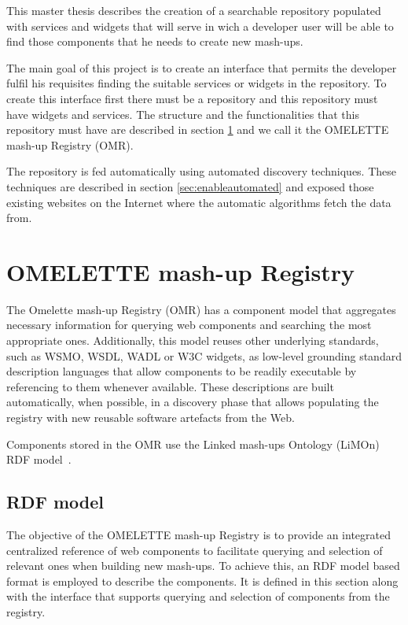 This master thesis describes the creation of a searchable repository populated with services and widgets that will serve in wich a developer user will be able to find those components that he needs to create new mash-ups.

The main goal of this project is to create an interface that permits the developer fulfil his requisites finding the suitable services or widgets in the repository. To create this interface first there must be a repository and this repository must have widgets and services. The structure and the functionalities that this repository must have are described in section \ref{sec:enableomr} and we call it the OMELETTE mash-up Registry (OMR).

The repository is fed automatically using automated discovery techniques. These techniques are described in section \ref{sec:enableautomated} and exposed those existing websites on the Internet where the automatic algorithms fetch the data from.

\section{OMELETTE mash-up Registry}
\label{sec:enableomr}

The Omelette mash-up Registry (OMR) has a component model that aggregates necessary information for querying web components and searching the most appropriate ones. Additionally, this model reuses other underlying standards, such as WSMO, WSDL, WADL or W3C widgets, as low-level grounding standard description languages that allow components to be readily executable by referencing to them whenever available. These descriptions are built automatically, when possible, in a discovery phase that allows populating the registry with new reusable software artefacts from the Web.

Components stored in the OMR use the Linked mash-ups Ontology (LiMOn) RDF model~\cite{limon}.


\subsection{RDF model}
\label{subsec:rdfmodel}

The objective of the OMELETTE mash-up Registry is to provide an integrated centralized reference of web components to
facilitate querying and selection of relevant ones when building new mash-ups. To achieve this, an RDF model based format is employed to describe the components. It is defined in this section along with the interface that supports querying and selection of components from the registry.

